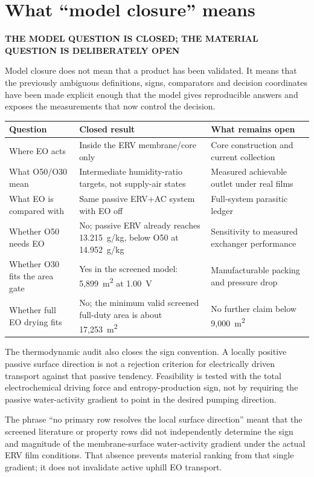 \documentclass[10pt,a4paper]{article}
\newcommand{\sans}{\fontfamily{qhv}\selectfont}
\newcommand{\eyebrow}[1]{{\sans\bfseries\color{Teal}\MakeUppercase{#1}}\par\vspace{1.5mm}}
\begin{document}
\clearpage
\section{What ``model closure'' means}
\eyebrow{The model question is closed; the material question is deliberately open}

Model closure does not mean that a product has been validated. It means that
the previously ambiguous definitions, signs, comparators and decision
coordinates have been made explicit enough that the model gives reproducible
answers and exposes the measurements that now control the decision.

\begin{tabularx}{\textwidth}{@{}p{}YY@{}}
\toprule
\textbf{Question} & \textbf{Closed result} & \textbf{What remains open} \\
\midrule
Where EO acts & Inside the ERV membrane/core only & Core construction and current collection \\
What O50/O30 mean & Intermediate humidity-ratio targets, not supply-air states & Measured achievable outlet under real films \\
What EO is compared with & Same passive ERV+AC system with EO off & Full-system parasitic ledger \\
Whether O50 needs EO & No; passive ERV already reaches 13.215~g/kg, below O50 at 14.952~g/kg & Sensitivity to measured exchanger performance \\
Whether O30 fits the area gate & Yes in the screened model: 5,899~m\textsuperscript{2} at 1.00~V & Manufacturable packing and pressure drop \\
Whether full EO drying fits & No; the minimum valid screened full-duty area is about 17,253~m\textsuperscript{2} & No further claim below 9,000~m\textsuperscript{2} \\
\bottomrule
\end{tabularx}

The thermodynamic audit also closes the sign convention. A locally positive
passive surface direction is not a rejection criterion for electrically
driven transport against that passive tendency. Feasibility is tested with
the total electrochemical driving force and entropy-production sign, not by
requiring the passive water-activity gradient to point in the desired pumping
direction.

\begin{warningbox}
The phrase ``no primary row resolves the local surface direction'' meant that
the screened literature or property rows did not independently determine the
sign and magnitude of the membrane-surface water-activity gradient under the
actual ERV film conditions. That absence prevents material ranking from that
single gradient; it does not invalidate active uphill EO transport.
\end{warningbox}
\end{document}
